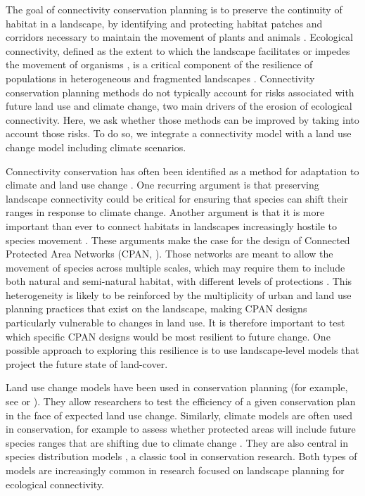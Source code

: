 The goal of connectivity conservation planning is to preserve the continuity of habitat in a landscape, by identifying and protecting habitat patches and corridors necessary to maintain the movement of plants and animals \citep{keeley_thirty_2019}. Ecological connectivity, defined as the extent to which the landscape facilitates or impedes the movement of organisms \citep{crooks_landscape_2006}, is a critical component of the resilience of populations in heterogeneous and fragmented landscapes \citep{gonzalez_spatial_2017}. Connectivity conservation planning methods do not typically account for risks associated with future land use and climate change, two main drivers of the erosion of ecological connectivity. Here, we ask whether those methods can be improved by taking into account those risks. To do so, we integrate a connectivity model with a land use change model including climate scenarios.

Connectivity conservation has often been identified as a method for adaptation to climate and land use change \citep{costanza_landscape_2019}. One recurring argument is that preserving landscape connectivity could be critical for ensuring that species can shift their ranges \citep{krosby_ecological_2010, keeley_making_2018} in response to climate change. Another argument is that it is more important than ever to connect habitats in landscapes increasingly hostile to species movement \citep{ellis_anthropogenic_2010}. These arguments make the case for the design of Connected Protected Area Networks (CPAN, \cite{opdam_ecological_2006, stewart_corridors_2019, gonzalez_spatial_2017}). Those networks are meant to allow the movement of species across multiple scales, which may require them to include both natural and semi-natural habitat, with different levels of protections \citep{daloia_coupled_2019}. This heterogeneity is likely to be reinforced by the multiplicity of urban and land use planning practices that exist on the landscape, making CPAN designs particularly vulnerable to changes in land use. It is therefore important to test which specific CPAN designs would be most resilient to future  change.  One possible approach to exploring this resilience is to use landscape-level models that project the future state of land-cover.

Land use change models have been used in conservation planning (for example, see \cite{echeverria_spatially_2008} or \cite{lesschen_identification_2007}). They allow researchers to test the efficiency of a given conservation plan in the face of expected land use change. Similarly, climate models are often used in conservation, for example to assess whether protected areas will include future species ranges that are shifting due to climate change \citep{araujo_would_2004, heller_targeting_2015}. They are also central in species distribution models \citep{porfirio_improving_2014}, a classic tool in conservation research. Both types of models are increasingly common in research focused on landscape planning for ecological connectivity.

